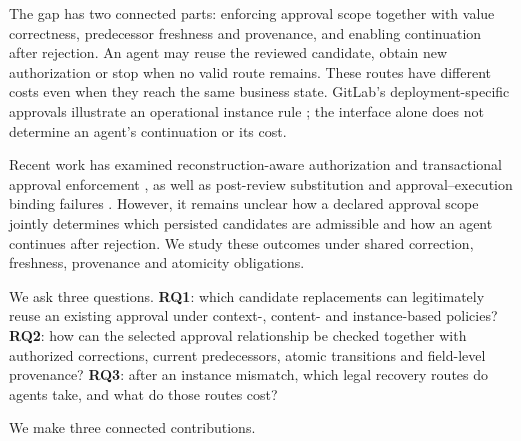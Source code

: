 \documentclass[pdflatex,sn-basic]{sn-jnl}
\begin{document}
The gap has two connected parts: enforcing approval scope together with value correctness, predecessor freshness and provenance, and enabling continuation after rejection. An agent may reuse the reviewed candidate, obtain new authorization or stop when no valid route remains. These routes have different costs even when they reach the same business state. GitLab's deployment-specific approvals illustrate an operational instance rule \citep{gitlab-deployment-approval}; the interface alone does not determine an agent's continuation or its cost.

Recent work has examined reconstruction-aware authorization and transactional approval enforcement \citep{zhu2026resa,bindschaedler2026guarded}, as well as post-review substitution and approval--execution binding failures \citep{kumar2026loopjacking,wang2026approval}. However, it remains unclear how a declared approval scope jointly determines which persisted candidates are admissible and how an agent continues after rejection. We study these outcomes under shared correction, freshness, provenance and atomicity obligations.

We ask three questions. \textbf{RQ1}: which candidate replacements can legitimately reuse an existing approval under context-, content- and instance-based policies? \textbf{RQ2}: how can the selected approval relationship be checked together with authorized corrections, current predecessors, atomic transitions and field-level provenance? \textbf{RQ3}: after an instance mismatch, which legal recovery routes do agents take, and what do those routes cost?

We make three connected contributions.
\end{document}
